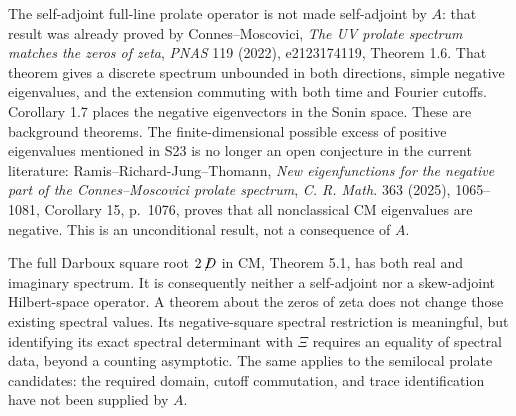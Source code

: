 The self-adjoint full-line prolate operator is not made self-adjoint
by \(A\): that result was already proved by Connes--Moscovici,
\emph{The UV prolate spectrum matches the zeros of zeta},
\emph{PNAS} 119 (2022), e2123174119, Theorem 1.6.  That theorem gives
a discrete spectrum unbounded in both directions, simple negative
eigenvalues, and the extension commuting with both time and Fourier
cutoffs.  Corollary 1.7 places the negative eigenvectors in the Sonin
space.  These are background theorems.
The finite-dimensional possible excess of positive eigenvalues
mentioned in S23 is no longer an open conjecture in the current
literature: Ramis--Richard-Jung--Thomann,
\emph{New eigenfunctions for the negative part of the Connes--Moscovici
prolate spectrum}, \emph{C. R. Math.} 363 (2025), 1065--1081,
Corollary 15, p.~1076, proves that all nonclassical CM eigenvalues are
negative.  This is an unconditional result, not a consequence of \(A\).

The full Darboux square root \(2\!\not\!D\) in CM, Theorem 5.1,
has both real and imaginary spectrum.  It is consequently neither a
self-adjoint nor a skew-adjoint Hilbert-space operator.  A theorem
about the zeros of zeta does not change those existing spectral values.
Its negative-square spectral restriction is meaningful, but identifying
its exact spectral determinant with \(\Xi\) requires an equality
of spectral data, beyond a counting asymptotic.  The same applies to
the semilocal prolate candidates: the required domain, cutoff
commutation, and trace identification have not been supplied by \(A\).

